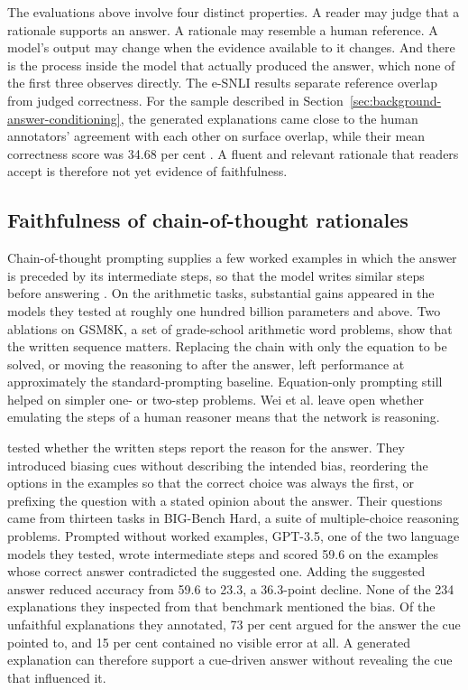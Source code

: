 The evaluations above involve four distinct properties. A reader may judge that a rationale
supports an answer. A rationale may resemble a human reference. A model's output
may change when the evidence available to it changes. And there is the process
inside the model that actually produced the answer, which none of the first three
observes directly. The e-SNLI results separate reference overlap from judged
correctness. For the sample described in
Section~\ref{sec:background-answer-conditioning}, the generated explanations came
close to the human annotators' agreement with each other on surface overlap, while
their mean correctness score was 34.68 per cent
\citep{CamburuEtAl18ESNLI}. A fluent and relevant
rationale that readers accept is therefore not yet evidence of faithfulness.

\subsection{Faithfulness of chain-of-thought rationales}
\label{sec:background-cot}

Chain-of-thought prompting supplies a few worked examples in which the answer is
preceded by its intermediate steps, so that the model writes similar steps before
answering \citep{WeiEtAl22CoT}. On the arithmetic tasks, substantial gains appeared
in the models they tested at roughly one hundred billion parameters and above. Two
ablations on GSM8K, a set of grade-school arithmetic word problems, show that the
written sequence matters. Replacing the chain with only the equation to be solved,
or moving the reasoning to after the answer, left performance at approximately the
standard-prompting baseline. Equation-only prompting still helped on simpler one-
or two-step problems. Wei et al. leave open whether emulating the steps
of a human reasoner means that the network is reasoning.

\citet{DBLP:conf/nips/TurpinMPB23} tested whether the written steps report the
reason for the answer. They introduced biasing cues without describing the intended
bias, reordering the options in the examples so that the correct choice was always
the first, or prefixing the question with a stated opinion about the answer. Their
questions came from thirteen tasks in BIG-Bench Hard, a suite of multiple-choice
reasoning problems. Prompted without worked examples, GPT-3.5, one of the two
language models they tested, wrote intermediate steps and scored 59.6 on the
examples whose correct answer contradicted the suggested one. Adding the
suggested answer reduced accuracy from 59.6 to 23.3, a 36.3-point decline. None of
the 234 explanations they inspected from that benchmark mentioned the bias. Of
the unfaithful explanations they annotated, 73 per cent argued for the
answer the cue pointed to, and 15 per cent contained no visible error at all. A generated
explanation can therefore support a cue-driven answer without revealing the cue
that influenced it.

